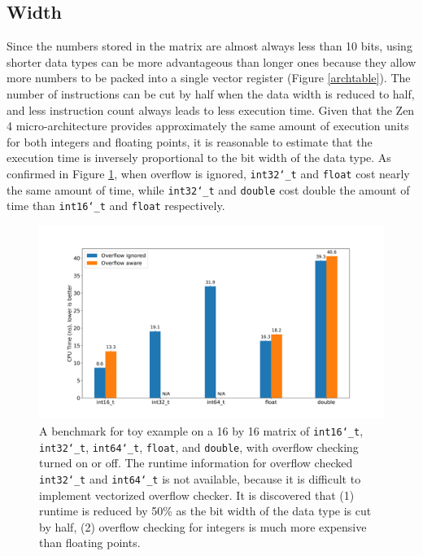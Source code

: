 \documentclass[logo,bsc,singlespacing,parskip]{infthesis}
\newcommand{\dtshort}{\texttt{int16\char`_t}}
\newcommand{\dtint}{\texttt{int32\char`_t}}
\newcommand{\dtlong}{\texttt{int64\char`_t}}
\newcommand{\dtfloat}{\texttt{float}}
\newcommand{\dtdouble}{\texttt{double}}
\begin{document}
\subsection{Width}
\label{sec:width} 
Since the numbers stored in the matrix are almost always less than 10 bits,
using shorter data types can be more advantageous than longer ones because they
allow more numbers to be packed into a single vector register (Figure
\ref{archtable}). The number of instructions can be cut by half when the data width
is reduced to half, and less instruction count always leads to less execution
time. Given that the Zen 4 micro-architecture provides approximately the same amount
of execution units for both integers and floating points, it is reasonable to
estimate that the execution time is inversely proportional to the bit width of the
data type. As confirmed in Figure \ref{bench_datatype}, when overflow is
ignored, \dtint{} and \dtfloat{} cost nearly the same amount of time, while
\dtint{} and \dtdouble{} cost double the amount of time than \dtshort{} and
\dtfloat{} respectively.


\begin{figure}[H]\captionsetup{name=Figure}
    \begin{center}
        \includegraphics[width=\linewidth]{image/bench_datatype.png}
    \end{center}
    \caption{ A benchmark for toy example on a 16 by 16 matrix of \dtshort{},
\dtint{}, \dtlong{}, \dtfloat{}, and \dtdouble{}, with overflow checking turned
on or off. The runtime information for overflow checked \dtint{} and \dtlong{}
is not available, because it is difficult to implement vectorized overflow
checker. It is discovered that (1) runtime is
reduced by 50\% as the bit width of the data type is cut by half, (2) overflow
checking for integers is much more expensive than floating points. }
    \label{bench_datatype}
\end{figure}
\end{document}
